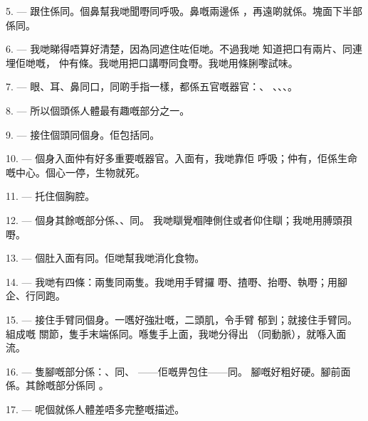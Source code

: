 5. --- 跟住係同。個鼻幫我哋聞嘢同呼吸。鼻嘅兩邊係
，再遠啲就係。塊面下半部係同。

6. --- 我哋睇得唔算好清楚，因為同遮住咗佢哋。不過我哋
知道把口有兩片、同連埋佢哋嘅，
仲有條。我哋用把口講嘢同食嘢。我哋用條脷嚟試味。

7. --- 眼、耳、鼻同口，同啲手指一樣，都係五官嘅器官：、
、、、。

8. --- 所以個頭係人體最有趣嘅部分之一。

\VUsaut{4.4mm}
\VUsaut{3.0mm}

9. --- 接住個頭同個身。佢包括同。

10. --- 個身入面仲有好多重要嘅器官。入面有，我哋靠佢
呼吸；仲有，佢係生命嘅中心。個心一停，生物就死。

11. --- 托住個胸腔。

12. --- 個身其餘嘅部分係、、同。
我哋瞓覺嗰陣側住或者仰住瞓；我哋用膊頭孭嘢。

13. --- 個肚入面有同。佢哋幫我哋消化食物。

\VUsaut{4.4mm}
\VUsaut{3.0mm}

14. --- 我哋有四條：兩隻同兩隻。我哋用手臂攞
嘢、揸嘢、抬嘢、執嘢；用腳企、行同跑。

15. --- 接住手臂同個身。一嚿好強壯嘅，二頭肌，令手臂
郁到；就接住手臂同。組成嘅
關節，隻手末端係同。喺隻手上面，我哋分得出
（同動脈），就喺入面流。

16. --- 隻腳嘅部分係：、同、
——佢嘅畀包住——同。
腳嘅好粗好硬。腳前面係。其餘嘅部分係同
。

17. --- 呢個就係人體差唔多完整嘅描述。

